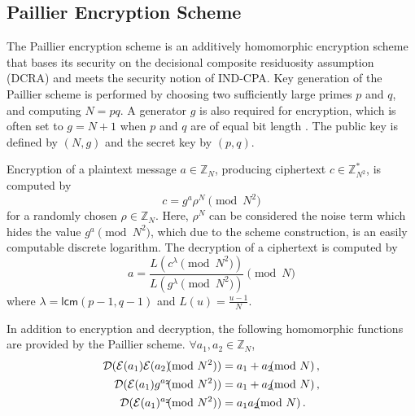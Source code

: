 \documentclass[10pt,letterpaper,oneside,twocolumn,journal]{IEEEtran}
\theoremstyle{definition}
\theoremstyle{definition}
\theoremstyle{remark}
\begin{document}
% 
% 

\subsection{Paillier Encryption Scheme} \label{subsec:paillier_scheme}
The Paillier encryption scheme \cite{paillierPublicKeyCryptosystemsBased1999} is an additively homomorphic encryption scheme that bases its security on the decisional composite residuosity assumption (DCRA) and meets the security notion of IND-CPA. Key generation of the Paillier scheme is performed by choosing two sufficiently large primes $p$ and $q$, and computing $N=pq$. A generator $g$ is also required for encryption, which is often set to $g=N+1$ when $p$ and $q$ are of equal bit length \cite{katzIntroductionModernCryptography2008}. The public key is defined by $(N, g)$ and the secret key by $(p, q)$.

Encryption of a plaintext message $a \in \mathbb{Z}_N$, producing ciphertext $c \in \mathbb{Z}^{*}_{N^2}$, is computed by
\begin{equation}
    c = g^a \rho^N \pmod{N^2}
\end{equation}
for a randomly chosen $\rho \in \mathbb{Z}_{N}$. Here, $\rho^N$ can be considered the noise term which hides the value $g^a \pmod{N^2}$, which due to the scheme construction, is an easily computable discrete logarithm. The decryption of a ciphertext is computed by
\begin{equation}
    a = \frac{L(c^\lambda\pmod{N^2})}{L(g^\lambda\pmod{N^2})} \pmod{N}
\end{equation}
where $\lambda = \mathsf{lcm}(p-1, q-1)$ and $L(u) = \frac{u-1}{N}$.

In addition to encryption and decryption, the following homomorphic functions are provided by the Paillier scheme. $\forall a_1,a_2 \in \mathbb{Z}_N$,
\begin{align}
    \mathcal{D}(\mathcal{E}(a_1)\mathcal{E}(a_2) \hspace{-7pt} \pmod{N^2}) &= a_1+a_2 \hspace{-7pt} \pmod{N}\,, \\
    \mathcal{D}(\mathcal{E}(a_1)g^{a_2} \hspace{-7pt} \pmod{N^2}) &= a_1+a_2\hspace{-7pt}\pmod{N}\,, \label{eqn:paillier_hom_plain_add}\\
    \mathcal{D}(\mathcal{E}(a_1)^{a_2} \hspace{-7pt} \pmod{N^2}) &= a_1a_2 \hspace{-7pt} \pmod{N}\,. \label{eqn:paillier_hom_mult}
\end{align}
\end{document}
